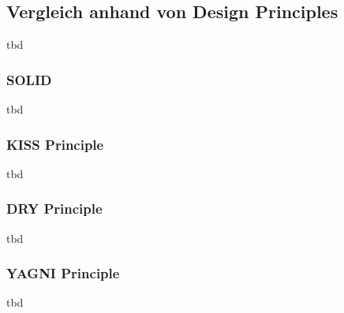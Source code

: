 \subsection{Vergleich anhand von Design Principles}
tbd

\subsubsection{SOLID}
tbd

\subsubsection{KISS Principle}
tbd

\subsubsection{DRY Principle}
tbd

\subsubsection{YAGNI Principle}
tbd
